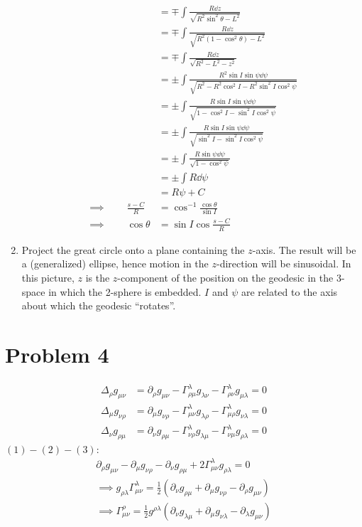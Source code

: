 \documentclass[12pt]{article}
\newcommand{\chrissym}[3]{\Gamma_{#2#3}^#1}
\begin{document}
\begin{enumerate}[label=(\alph*)]
\begin{align*}
        &= \mp\int\frac{R\dd z}{\sqrt{R^2\sin^2\theta - L^2}} \\
        &= \mp\int\frac{R\dd z}{\sqrt{R^2\left(1 - \cos^2\theta\right) - L^2}} \\
        &= \mp\int\frac{R\dd z}{\sqrt{R^2 - L^2 - z^2}} \\
        &= \pm\int\frac{R^2\sin I\sin\psi\dd\psi}{\sqrt{R^2 - R^2\cos^2I - R^2\sin^2I\cos^2\psi}} \\
        &= \pm\int\frac{R\sin I\sin\psi\dd\psi}{\sqrt{1 - \cos^2I - \sin^2I\cos^2\psi}} \\
        &= \pm\int\frac{R\sin I\sin\psi\dd\psi}{\sqrt{\sin^2I - \sin^2I\cos^2\psi}} \\
        &= \pm\int\frac{R\sin\psi\dd\psi}{\sqrt{1 - \cos^2\psi}} \\
        &= \pm\int R\dd\psi \\
        &= R\psi + C \\
        \implies \qquad \frac{s-C}{R} &= \cos^{-1}\frac{\cos\theta}{\sin I} \\
        \implies \qquad \cos\theta &= \sin I\cos\frac{s-C}{R}
    \end{align*}

    \item Project the great circle onto a plane containing the $z$-axis. The result will be a (generalized) ellipse, hence motion in the $z$-direction will be sinusoidal. In this picture, $z$ is the $z$-component of the position on the geodesic in the 3-space in which the 2-sphere is embedded. $I$ and $\psi$ are related to the axis about which the geodesic ``rotates''.
\end{enumerate}


\section*{Problem 4}
\begin{align}
    \Delta_\rho g_{\mu\nu} &= \partial_\rho g_{\mu\nu} - \chrissym{\lambda}{\rho}{\mu}g_{\lambda\nu} - \chrissym{\lambda}{\rho}{\nu}g_{\mu\lambda} = 0 \\
    \Delta_\mu g_{\nu\rho} &= \partial_\mu g_{\nu\rho} - \chrissym{\lambda}{\mu}{\nu}g_{\lambda\rho} - \chrissym{\lambda}{\mu}{\rho}g_{\nu\lambda} = 0 \\
    \Delta_\nu g_{\rho\mu} &= \partial_\nu g_{\rho\mu} - \chrissym{\lambda}{\nu}{\rho}g_{\lambda\mu} - \chrissym{\lambda}{\nu}{\mu}g_{\rho\lambda} = 0
\end{align}
$(1) - (2) - (3)$:
\begin{align*}
    \partial_\rho g_{\mu\nu} - \partial_\mu g_{\nu\rho} - \partial_\nu g_{\rho\mu} + 2\chrissym{\lambda}{\mu}{\nu}g_{\rho\lambda} = 0 \\
    \implies g_{\rho\lambda}\chrissym{\lambda}{\mu}{\nu} = \frac{1}{2}\left(\partial_\nu g_{\rho\mu} + \partial_\mu g_{\nu\rho} - \partial_\rho g_{\mu\nu} \right) \\
    \implies \chrissym{\rho}{\mu}{\nu} = \frac{1}{2} g^{\rho\lambda}\left(\partial_\nu g_{\lambda\mu} + \partial_\mu g_{\nu\lambda} - \partial_\lambda g_{\mu\nu}\right)
\end{align*}
\end{document}
